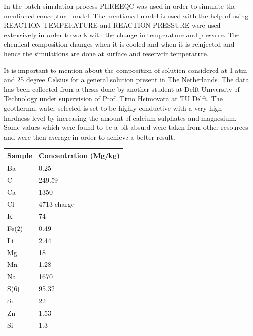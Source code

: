 In the batch simulation process PHREEQC was used in order to simulate the mentioned conceptual model. The mentioned model is used with the help of using REACTION TEMPERATURE and REACTION PRESSURE were used extensively in order to work with the change in temperature and pressure. The chemical composition changes when it is cooled and when it is reinjected and hence the simulations are done at surface and reservoir temperature. 

It is important to mention about the composition of solution considered at 1 atm and 25 degree Celsius for a general solution present in The Netherlands. The data has been collected from a thesis done by another student at Delft University of Technology under supervision of Prof. Timo Heimovara at TU Delft.  \cite{van2012mineral} The geothermal water selected is set to be highly conductive with a very high hardness level by increasing the amount of calcium sulphates and magnesium. Some values which were found to be a bit absurd were taken from other resources and were then average in order to achieve a better result. \cite{tomaszewska2017assessment}
\begin{table}[h!]
\centering
\begin{tabular}{|l|l|}
\hline
\textbf{Sample} & \textbf{Concentration (Mg/kg)} \\ \hline
Ba              & 0.25                           \\ \hline
C               & 249.59                         \\ \hline
Ca              & 1350                           \\ \hline
Cl              & 4713 charge                    \\ \hline
K               & 74                             \\ \hline
Fe(2)           & 0.49                           \\ \hline
Li              & 2.44                           \\ \hline
Mg              & 18                             \\ \hline
Mn              & 1.28                           \\ \hline
Na              & 1670                           \\ \hline
S(6)            & 95.32                          \\ \hline
Sr              & 22                             \\ \hline
Zn              & 1.53                           \\ \hline
Si              & 1.3                            \\ \hline
\end{tabular}
\label{ChemComp}
\end{table}
